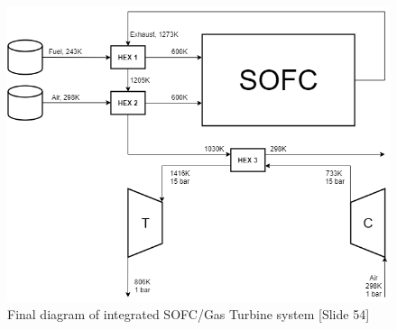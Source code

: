 \documentclass[11pt, oneside]{article}
\begin{document}
      \begin{figure}[htb]
        \centering
        \includegraphics[scale=0.6]{SOFC/handout/Systemdiagram.png}
        \caption{Final diagram of integrated SOFC/Gas Turbine system [Slide 54]}
        \label{fig: Simple diagram of a single Solid Oxide Fuel Cell}
    \end{figure}
    
\end{document}
